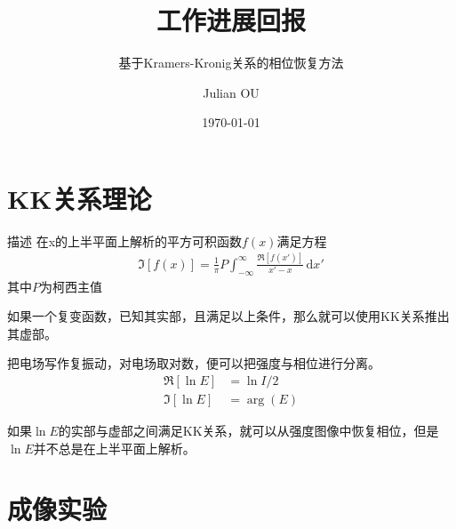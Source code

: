 \documentclass[12pt,aspectratio=169]{beamer} %
\title{工作进展回报} %
\subtitle{基于Kramers-Kronig关系的相位恢复方法}
\author{Julian OU} %
\institute[SCU]{\textit{College of Physics, Sichuan University, Chengdu 610064, China}}
\date{\today} %
\begin{document}
\maketitle %


\AtBeginSubsection{
    \begin{frame}
        \subsectionpage
    \end{frame}
}

\section{KK关系理论}

\begin{frame}
    \begin{block}{描述}
        在x的上半平面上解析的平方可积函数$f(x)$满足方程
        \begin{align} 
            \Im[f(x)]=\frac{1}{\pi}P \int_{-\infty}^{\infty}\frac{\Re[f(x')]}{x'-x} \, \mathrm{d}x'
        \end{align}
        其中$P$为柯西主值
    \end{block}
    如果一个复变函数，已知其实部，且满足以上条件，那么就可以使用KK关系推出其虚部。
\end{frame}

\begin{frame}
    把电场写作复振动，对电场取对数，便可以把强度与相位进行分离。
    \begin{align}
        \Re[\ln E] & =\ln I /2 \\
        \Im[\ln E] & =\arg (E)
    \end{align}
    
    如果$\ln E$的实部与虚部之间满足KK关系，就可以从强度图像中恢复相位，但是$\ln E$并不总是在上半平面上解析。
\end{frame}

\section{成像实验}
\end{document}
